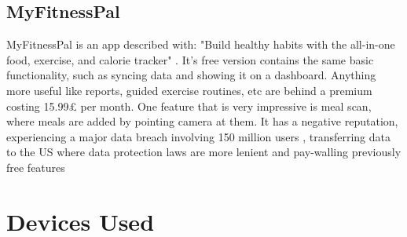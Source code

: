 \subsection{MyFitnessPal}
MyFitnessPal is an app described with: "Build healthy habits with the all-in-one food, exercise, and calorie tracker" \cite{fitnesspal}. It's free version contains the same basic functionality, such as syncing data and showing it on a dashboard. Anything more useful like reports, guided exercise routines, etc are behind a premium costing 15.99£ per month. One feature that is very impressive is meal scan, where meals are added by pointing camera at them. It has a negative reputation, experiencing a major data breach involving 150 million users \cite{masuch2021fitness, myFitnessPalDataBreach}, transferring data to the US \cite{myfitnesspalTransferring} where data protection laws are more lenient and pay-walling previously free features \cite{myfitnesspalPaywall}
 
\section{Devices Used}
